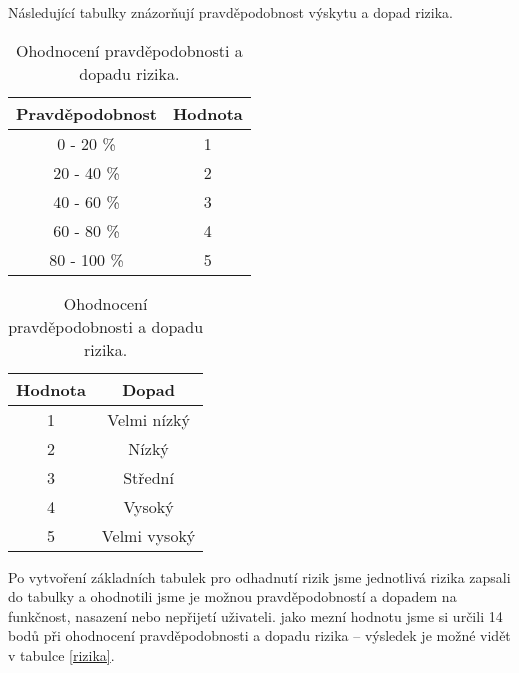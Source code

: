 \par Následující tabulky znázorňují pravděpodobnost výskytu a dopad rizika.
\begin{table}[!htb]
    \begin{minipage}{.5\linewidth}
      \centering
\begin{tabular}{|c | c |}
\hline
Pravděpodobnost&Hodnota\\
\hline
0 - 20 \%&1\\
\hline
20 - 40 \%&2\\
\hline
40 - 60 \%&3\\
\hline
60 - 80 \%&4\\
\hline
80 - 100 \%&5\\
\hline
\end{tabular}
    \end{minipage}%
    \begin{minipage}{.5\linewidth}
      \centering

\begin{tabular}{|c | c |}
\hline
Hodnota&Dopad\\
\hline
1&Velmi nízký\\
\hline
2&Nízký\\
\hline
3&Střední\\
\hline
4&Vysoký\\
\hline
5&Velmi vysoký\\
\hline
\end{tabular}
    \end{minipage} 
    \caption{Ohodnocení pravděpodobnosti a dopadu rizika.}
\end{table}

\par Po vytvoření základních tabulek pro odhadnutí rizik jsme jednotlivá rizika zapsali do tabulky a ohodnotili jsme je možnou pravděpodobností a dopadem na funkčnost, nasazení nebo nepřijetí uživateli. jako mezní hodnotu jsme si určili 14 bodů při ohodnocení pravděpodobnosti a dopadu rizika -- výsledek je možné vidět v tabulce \ref{rizika}.

